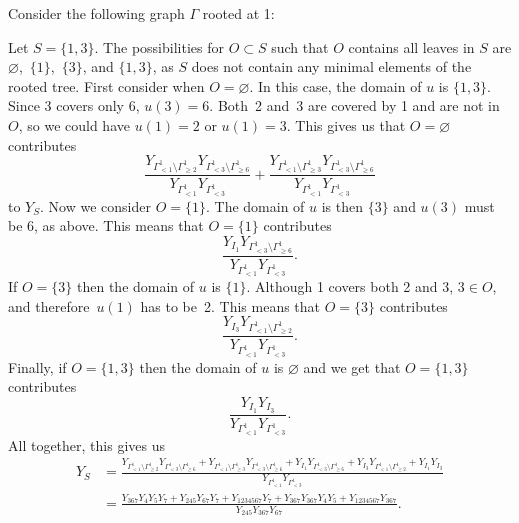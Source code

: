 \documentclass[10pt,a4paper]{amsart}
\numberwithin{equation}{section}
\begin{document}
\begin{Example}Consider the following graph $\Gamma$ rooted at 1:
\begin{center}
\end{center}
Let $S=\{1,3\}$. The possibilities for $O\subset S$ such that $O$ contains all leaves in $S$ are $\varnothing$,~$\{1\}$,~$\{3\}$, and $\{1,3\}$, as $S$ does not contain any minimal elements of the rooted tree. First consider when $O=\varnothing$. In this case, the domain of $u$ is $\{1,3\}$. Since 3 covers only 6, $u(3)=6$. Both~2 and~3 are covered by 1 and are not in $O$, so we could have $u(1)=2$ or $u(1)=3$. This gives us that $O=\varnothing$ contributes
\[ \frac{Y_{\Gamma_{< 1}^1\setminus\Gamma_{\geq 2}^1}Y_{\Gamma_{< 3}^1\setminus\Gamma_{\geq 6}^1}}{Y_{\Gamma_{< 1}^1}Y_{\Gamma_{< 3}^1}}+\frac{Y_{\Gamma_{< 1}^1\setminus\Gamma_{\geq 3}^1}Y_{\Gamma_{< 3}^1\setminus\Gamma_{\geq 6}^1}}{Y_{\Gamma_{< 1}^1}Y_{\Gamma_{< 3}^1}}\]
to $Y_S$.
Now we consider $O=\{1\}$. The domain of $u$ is then $\{3\}$ and $u(3)$ must be 6, as above. This means that $O=\{1\}$ contributes \[ \frac{Y_{I_1}Y_{\Gamma_{< 3}^1\setminus\Gamma_{\geq 6}^1}}{Y_{\Gamma_{< 1}^1}Y_{\Gamma_{< 3}^1}}.\]
If $O=\{3\}$ then the domain of $u$ is $\{1\}$. Although 1 covers both 2 and 3, $3\in O$, and therefore~$u(1)$ has to be~2. This means that $O=\{3\}$ contributes
\[ \frac{Y_{I_3}Y_{\Gamma_{< 1}^1\setminus\Gamma_{\geq 2}^1}}{Y_{\Gamma_{< 1}^1}Y_{\Gamma_{< 3}^1}}.\]
Finally, if $O=\{1,3\}$ then the domain of $u$ is $\varnothing$ and we get that $O=\{1,3\}$ contributes \[ \frac{Y_{I_1}Y_{I_3}}{Y_{\Gamma_{< 1}^1}Y_{\Gamma_{< 3}^1}}.\]
All together, this gives us
\begin{align*}
Y_S&=\frac{Y_{\Gamma_{< 1}^1\setminus\Gamma_{\geq 2}^1}Y_{\Gamma_{< 3}^1\setminus\Gamma_{\geq 6}^1}+Y_{\Gamma_{< 1}^1\setminus\Gamma_{\geq 3}^1}Y_{\Gamma_{< 3}^1\setminus\Gamma_{\geq 6}^1}+Y_{I_1}Y_{\Gamma_{< 3}^1\setminus\Gamma_{\geq 6}^1}+Y_{I_3}Y_{\Gamma_{< 1}^1\setminus\Gamma_{\geq 2}^1}+Y_{I_1}Y_{I_3}}{Y_{\Gamma_{< 1}^1}Y_{\Gamma_{< 3}^1}}\\
&=\frac{Y_{367}Y_4Y_5Y_7+Y_{245}Y_{67}Y_7+Y_{1234567}Y_7+Y_{367}Y_{367}Y_4Y_5+Y_{1234567}Y_{367}}{Y_{245}Y_{367}Y_{67}}.
\end{align*}
\end{Example}
\end{document}
